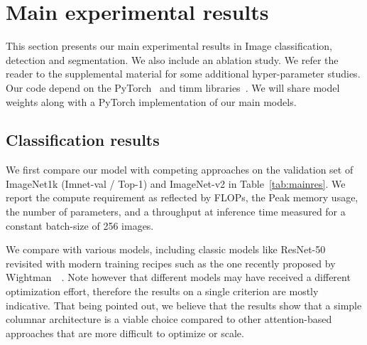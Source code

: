\section{Main experimental results}
\label{sec:experiments}

This section presents our main experimental results in Image classification, detection and segmentation. We also include an ablation study. 
We refer the reader to the supplemental material for some additional hyper-parameter studies. 
Our code depend on the PyTorch~\cite{pytorch} and timm libraries~\cite{pytorchmodels}. We will share model weights along with a PyTorch implementation of our main models. 

\subsection{Classification results}
We first compare our model with competing approaches on the validation set of ImageNet1k (Imnet-val / Top-1) and ImageNet-v2 in Table~\ref{tab:mainres}. 
We report the compute requirement as reflected by FLOPs, the Peak memory usage, the number of parameters, and a throughput at inference time measured for a constant batch-size of 256 images.
%

We compare with various models, including classic models like ResNet-50 revisited with modern training recipes such as the one recently proposed by Wightman~\etal~\cite{wightman2021resnet}. 
Note however that different models may have received a different optimization effort, therefore the results on a single criterion are mostly indicative. That being pointed out, we believe that the \ournet results show that a simple columnar architecture is a viable choice compared to other attention-based approaches that are more difficult to optimize or scale.
%


